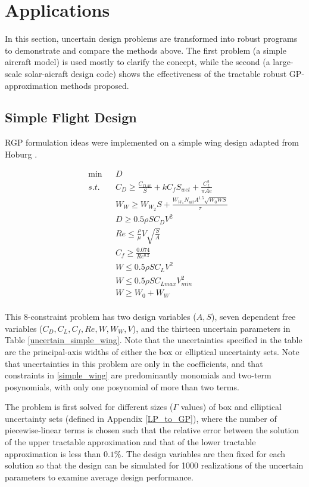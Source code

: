 \section{Applications} \label{apps}
In this section, uncertain design problems are transformed into robust programs to demonstrate and compare the methods above. The first problem (a simple aircraft model) is used mostly to clarify the concept, while the second (a large-scale solar-aicraft design code) shows the effectiveness of the tractable robust GP-approximation methods proposed.

\subsection{Simple Flight Design}
RGP formulation ideas were implemented on a simple wing design adapted from Hoburg \cite{hoburg_abbeel_2014}.

\begin{equation}
\begin{aligned}
	&\min &&D\\
	& s.t. &&C_D \geq \frac{C_{DA0}}{S} + kC_fS_{wet} + \frac{C_L^2}{\pi Ae}\\
	& &&W_W \geq W_{W_2} S + \frac{W_{W_1}N_{utl}A^{1.5}\sqrt{W_0WS}}{\tau}\\
	& &&D \geq 0.5\rho SC_DV^2\\
	& &&Re \leq \frac{\rho}{\mu}V\sqrt{\frac{S}{A}}\\
	& &&C_f \geq \frac{0.074}{Re^0.2}\\
	& &&W \leq 0.5\rho S C_LV^2\\
	& &&W \leq 0.5\rho S C_{Lmax}V_{min}^2\\
	& &&W \geq W_0 + W_W
\end{aligned}
\label{simple_wing}
\end{equation}
\ \\
This 8-constraint problem has two design variables ($A, S$), seven dependent free variables ($C_D, C_L, C_f, Re, W, W_W, V$), and the thirteen uncertain parameters in Table \ref{uncertain_simple_wing}. Note that the uncertainties specified in the table are the principal-axis widths of either the box or elliptical uncertainty sets. Note that uncertainties in this problem are only in the coefficients, and that constraints in \eqref{simple_wing} are predominantly monomials and two-term posynomials, with only one posynomial of more than two terms.

The problem is first solved for different sizes ($\Gamma$ values) of box and elliptical uncertainty sets (defined in Appendix \ref{LP_to_GP}), where the number of piecewise-linear terms is chosen such that the relative error between the solution of the upper tractable approximation and that of the lower tractable approximation is less than $0.1\%$. The design variables are then fixed for each solution so that the design can be simulated for 1000 realizations of the uncertain parameters to examine average design performance.

